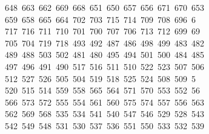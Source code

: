 \begin{tabbing}
\>\ 648\ 663\ 662\ 669\ 668\ 651\ 650\ 657\ 656\ 671\ 670\ 653\ \\[0pt]
\ 659\ 658\ 665\ 664\ 702\ 703\ 715\ 714\ 709\ 708\ 696\ 6\\[0pt]
\ 717\ 716\ 711\ 710\ 701\ 700\ 707\ 706\ 713\ 712\ 699\ 69\\[0pt]
\ 705\ 704\ 719\ 718\ 493\ 492\ 487\ 486\ 498\ 499\ 483\ 482\\[0pt]
\>\ 489\ 488\ 503\ 502\ 481\ 480\ 495\ 494\ 501\ 500\ 484\ 485\\[0pt]
\>\ 497\ 496\ 491\ 490\ 517\ 516\ 511\ 510\ 522\ 523\ 507\ 506\ \\[0pt]
\ 512\ 527\ 526\ 505\ 504\ 519\ 518\ 525\ 524\ 508\ 509\ 5\\[0pt]
\ 520\ 515\ 514\ 559\ 558\ 565\ 564\ 571\ 570\ 553\ 552\ 56\\[0pt]
\ 566\ 573\ 572\ 555\ 554\ 561\ 560\ 575\ 574\ 557\ 556\ 563\\[0pt]
\>\ 562\ 569\ 568\ 535\ 534\ 541\ 540\ 547\ 546\ 529\ 528\ 543\\[0pt]
\>\ 542\ 549\ 548\ 531\ 530\ 537\ 536\ 551\ 550\ 533\ 532\ 539\ \\[0pt]

\end{tabbing}
